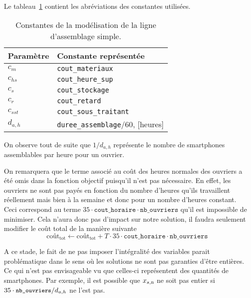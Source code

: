 Le tableau~\ref{tab:constantesQuestion1} contient les abréviations
des constantes utilisées.
\begin{table}[h]
  \begin{center}
  \begin{tabular}{|l|l|}
    \hline
    Paramètre & Constante représentée \\
    \hline
    \hline
    $c_m$ & \texttt{cout\_materiaux} \\
    \hline
    $c_{hs}$ & \texttt{cout\_heure\_sup} \\
    \hline
    $c_s$ & \texttt{cout\_stockage} \\
    \hline
    $c_r$ & \texttt{cout\_retard} \\
    \hline
    $c_{sst}$ & \texttt{cout\_sous\_traitant} \\
    \hline
    $d_{a,h}$ & \texttt{duree\_assemblage}/60, [heures] \\
    \hline
  \end{tabular}
  \caption{Constantes de la modélisation de la ligne d'assemblage simple.}
  \label{tab:constantesQuestion1}
  \end{center}
\end{table}

On observe tout de suite que $1/d_{a,h}$ représente le nombre de smartphones assemblables par heure pour un ouvrier.

On remarquera que le terme associé au coût des heures normales des ouvriers
a été omis dans la fonction objectif puisqu'il n'est pas nécessaire.
En effet, les ouvriers ne sont pas payés en fonction du nombre
d'heures qu'ils travaillent réellement mais bien à la semaine et
donc pour un nombre d'heures constant.
Ceci correspond au terme $35\cdot\texttt{cout\_horaire}\cdot
\texttt{nb\_ouvriers}$ qu'il est impossible de minimiser.
Cela n'aura donc pas d'impact sur notre solution,
il faudra seulement modifier le coût total de la manière suivante
\[ \text{coût}_\text{tot} \leftarrow \text{coût}_\text{tot} + T \cdot 35 \cdot\texttt{cout\_horaire}\cdot
\texttt{nb\_ouvriers} \]

A ce stade, le fait de ne pas imposer l'intégralité des variables
parait problématique dans le sens où les solutions ne sont pas 
garanties d'être entières. Ce qui n'est pas envisageable 
vu que celles-ci représentent des quantités de smartphones.
Par exemple, il est possible que
$x_{s,\text{n}}$ ne soit pas entier si $35\cdot {\small\texttt{nb\_ouvriers}}/ d_{a,h}$ ne l'est pas.
